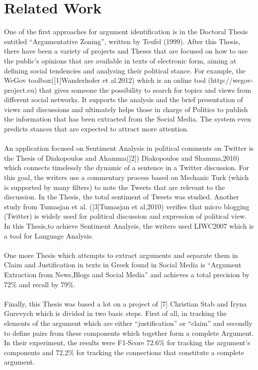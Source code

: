 \section{Related Work}\label{24_ref}
One of the first approaches for argument identification is in the Doctoral Thesis  entitled ``Argumentative Zoning'', written by Teufel (1999). After this Thesis, there have been a variety of projects and Theses that are focused on how to use the public's opinions that are available in texts of electronic form, aiming at defining social tendencies and analysing their political stance. For example, the WeGov toolbox([1]Wanderhofer et al.2012) which is an online tool (http://wegov-project.eu) that gives someone the possibility to search for topics and views from different social networks. It supports the analysis and the brief presentation of views and discussions and ultimately helps those in charge of Politics to publish the information that has been extracted from the Social Media. The system even predicts stances that are expected to attract more attention.\\
\\
An application focused on Sentiment Analysis in political comments on Twitter is the Thesis of Diakopoulos and Ahamma([2]) Diakopoulos and Shamma,2010) which connects  timelessly the dynamic of a sentence in a Twitter discussion. For this goal, the writers use a commentary process based on Mechanic Turk (which is supported by many filters) to note the Tweets that are relevant to the discussion. In the Thesis, the total sentiment of Tweets was studied. Another study from Tumasjan et al. ([3]Tumasjan et al,2010) verifies that micro blogging (Twitter) is widely used for political discussion and expression of political view. In this Thesis,to achieve Sentiment Analysis, the writers used LIWC2007 which is a tool for Language Analysis.\\
\\
One more Thesis which attempts to extract arguments and separate them in Claim and Justification in texts in Greek found in Social Media is ``Argument Extraction from News,Blogs and Social Media'' and achieves a total precision by 72\% and recall by 79\%.\\
\\
Finally, this Thesis was based a lot on a project of [7] Christian Stab and Iryna Gurevych which is divided in two basic steps. First of all, in tracking the elements of the argument which are either ``justification'' or ``claim'' and secondly to define pairs from these components which together form a complete Argument. In their experiment, the results were  F1-Score 72.6\% for tracking the argument's components and 72,2\% for tracking the connections that constitute a complete argument.
